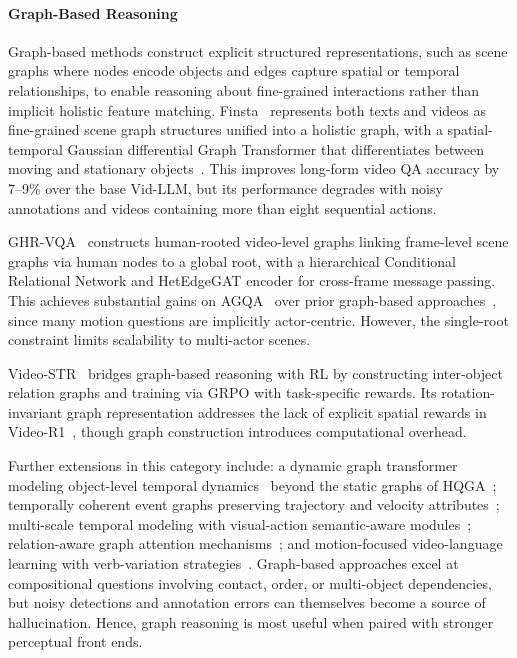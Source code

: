 \documentclass[10pt]{article} %
\begin{document}
\paragraph{Graph-Based Reasoning}

Graph-based methods construct explicit structured representations, such as scene graphs where nodes encode objects and edges capture spatial or temporal relationships, to enable reasoning about fine-grained interactions rather than implicit holistic feature matching. Finsta~\citep{Fei2024EnhancingVR} represents both texts and videos as fine-grained scene graph structures unified into a holistic graph, with a spatial-temporal Gaussian differential Graph Transformer that differentiates between moving and stationary objects~\citep{Sun2022LongFormVP}. This improves long-form video QA accuracy by 7--9\% over the base Vid-LLM, but its performance degrades with noisy annotations and videos containing more than eight sequential actions.

GHR-VQA~\citep{Brilli2025GHRVQAGH} constructs human-rooted video-level graphs linking frame-level scene graphs via human nodes to a global root, with a hierarchical Conditional Relational Network and HetEdgeGAT encoder for cross-frame message passing. This achieves substantial gains on AGQA~\citep{grunde2021agqa} over prior graph-based approaches~\citep{Khan2023LearningSH}, since many motion questions are implicitly actor-centric. However, the single-root constraint limits scalability to multi-actor scenes.

Video-STR~\citep{Wang2025VideoSTRRM} bridges graph-based reasoning with RL by constructing inter-object relation graphs and training via GRPO with task-specific rewards. Its rotation-invariant graph representation addresses the lack of explicit spatial rewards in Video-R1~\citep{Feng2025VideoR1RV}, though graph construction introduces computational overhead.

Further extensions in this category include: a dynamic graph transformer modeling object-level temporal dynamics~\citep{Xiao2022VideoGT} beyond the static graphs of HQGA~\citep{Peng2022MultilevelHN}; temporally coherent event graphs preserving trajectory and velocity attributes~\citep{Masala2025FromVT}; multi-scale temporal modeling with visual-action semantic-aware modules~\citep{Liu2025CapturingRB}; relation-aware graph attention mechanisms~\citep{Wang2023ReGRRG}; and motion-focused video-language learning with verb-variation strategies~\citep{Doughty2024LocoMotionLM}. Graph-based approaches excel at compositional questions involving contact, order, or multi-object dependencies, but noisy detections and annotation errors can themselves become a source of hallucination. Hence, graph reasoning is most useful when paired with stronger perceptual front ends.
\end{document}
